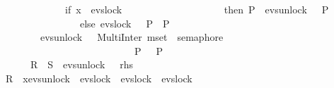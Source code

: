 \begin{isabellebody}
\ \ \ \ \ \ \ \ \ \ \ \ \ \ {\isasymrightarrow}\ {\isacharparenleft}{\kern0pt}if\ x\ {\isacharequal}{\kern0pt}\ evs{\isachardot}{\kern0pt}lock\ {}\ \isanewline
\ \ \ \ \ \ \ \ \ \ \ \ \ \ \ \ \ \ then\ P{}\ {\isacharbar}{\kern0pt}{\isacharbar}{\kern0pt}{\isacharbar}{\kern0pt}\ evs{\isachardot}{\kern0pt}unlock\ {}\ {\isasymrightarrow}\ P{}\ \isanewline
\ \ \ \ \ \ \ \ \ \ \ \ \ \ \ \ \ \ else\ evs{\isachardot}{\kern0pt}lock\ {}\ {\isasymrightarrow}\ P{}\ {\isacharbar}{\kern0pt}{\isacharbar}{\kern0pt}{\isacharbar}{\kern0pt}\ P{}{\isacharparenright}{\kern0pt}\ \isanewline
\ \ \ \ \ \ \ \ {\isacharequal}{\kern0pt}\ \isanewline
\ \ \ \ \ \ \ \ \ \ {\isacharparenleft}{\kern0pt}evs{\isachardot}{\kern0pt}unlock\ {}\ {\isasymrightarrow}\ {\isacharparenleft}{\kern0pt}{\isacharparenleft}{\kern0pt}MultiInter\ {\isacharparenleft}{\kern0pt}mset\ {\isacharbrackleft}{\kern0pt}{}{\isachardot}{\kern0pt}{\isachardot}{\kern0pt}{}{\isacharbrackright}{\kern0pt}{\isacharparenright}{\kern0pt}\ semaphore{\isacharparenright}{\kern0pt}\ \isanewline
\ \ \ \ \ \ \ \ \ \ \ \ \ \ \ \ \ \ \ \ \ \ \ \ \ \ \ \ {\isacharbar}{\kern0pt}{\isacharbar}{\kern0pt}\ {\isacharparenleft}{\kern0pt}P{}\ \ {\isacharbar}{\kern0pt}{\isacharbar}{\kern0pt}{\isacharbar}{\kern0pt}\ P{}{\isacharparenright}{\kern0pt}{\isacharparenright}{\kern0pt}{\isacharparenright}{\kern0pt}\isanewline
\ \ \ \ \ \ \ \ {\isacartoucheclose}\isanewline
\ \ \ \ \ \ \ {\isacharparenleft}{\kern0pt}\ {\isachardoublequoteopen}{\isacharparenleft}{\kern0pt}{\isacharquery}{\kern0pt}R\ {\isacharbar}{\kern0pt}{\isacharbar}{\kern0pt}\ {\isacharquery}{\kern0pt}S{\isacharparenright}{\kern0pt}\ {\isacharequal}{\kern0pt}\ evs{\isachardot}{\kern0pt}unlock\ {}\ {\isasymrightarrow}\ {\isacharquery}{\kern0pt}rhs{\isachardoublequoteclose}{\isacharparenright}{\kern0pt}\ \isanewline
%
\isadelimproof
%
\endisadelimproof
%
\isatagproof
{}\isamarkupfalse%
\ {\isacharminus}{\kern0pt}\isanewline
\ \ \isamarkupfalse%
\ {}\ {\isacharcolon}{\kern0pt}\ {\isachardoublequoteopen}{\isacharquery}{\kern0pt}R\ {\isacharequal}{\kern0pt}\ {\isasymbox}x{\isasymin}{\isacharbraceleft}{\kern0pt}evs{\isachardot}{\kern0pt}unlock\ {}{\isacharcomma}{\kern0pt}\ evs{\isachardot}{\kern0pt}lock\ {}{\isacharcomma}{\kern0pt}\ evs{\isachardot}{\kern0pt}lock\ {}{\isacharcomma}{\kern0pt}\ evs{\isachardot}{\kern0pt}lock\ {}{\isacharbraceright}{\kern0pt}\isanewline

\end{isabellebody}
